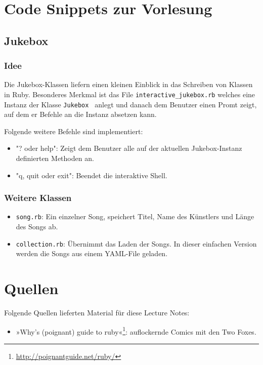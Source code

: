\documentclass[a4book,11pt,twoside]{scrbook}
\begin{document}
\chapter{Code Snippets zur Vorlesung}

\section{Jukebox}
\subsection*{Idee}
Die Jukebox-Klassen liefern einen kleinen Einblick in das Schreiben von Klassen in Ruby. Besonderes Merkmal ist das File \texttt{interactive\_jukebox.rb} welches eine Instanz der Klasse \texttt{Jukebox	} anlegt und danach dem Benutzer einen Promt zeigt, auf dem er Befehle an die Instanz absetzen kann.

Folgende weitere Befehle sind implementiert:

\begin{itemize}
\item "? oder help": Zeigt dem Benutzer alle auf der aktuellen Jukebox-Instanz definierten Methoden an.
\item "q, quit oder exit": Beendet die interaktive Shell.
\end{itemize}


\subsection*{Weitere Klassen}

\begin{itemize}
\item \texttt{song.rb}: Ein einzelner Song, speichert Titel, Name des Künstlers und Länge des Songs ab.
\item \texttt{collection.rb}: Übernimmt das Laden der Songs. In dieser einfachen Version werden die Songs aus einem YAML-File geladen. 
\end{itemize}








\chapter*{Quellen} %
\label{cha:quellen}
Folgende Quellen lieferten Material für diese Lecture Notes:

\begin{itemize}
	\item »Why's (poignant) guide to ruby«\footnote{\url{http://poignantguide.net/ruby/}}: auflockernde Comics mit den Two Foxes.
\end{itemize}
\end{document}
